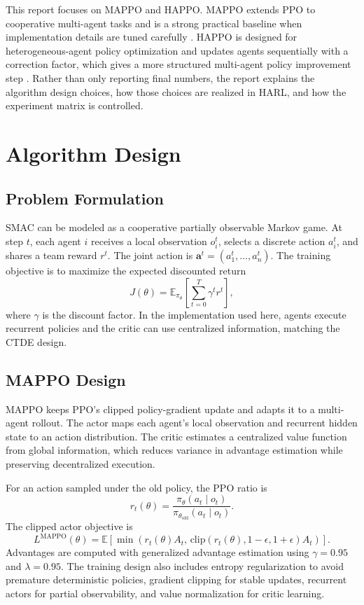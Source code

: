 \documentclass{article}
\begin{document}
This report focuses on MAPPO and HAPPO. MAPPO extends PPO to cooperative multi-agent tasks and is a strong practical baseline when implementation details are tuned carefully \cite{yu2022surprising}. HAPPO is designed for heterogeneous-agent policy optimization and updates agents sequentially with a correction factor, which gives a more structured multi-agent policy improvement step \cite{zhong2024heterogeneous}. Rather than only reporting final numbers, the report explains the algorithm design choices, how those choices are realized in HARL, and how the experiment matrix is controlled.

\section{Algorithm Design}

\subsection{Problem Formulation}

SMAC can be modeled as a cooperative partially observable Markov game. At step \(t\), each agent \(i\) receives a local observation \(o_i^t\), selects a discrete action \(a_i^t\), and shares a team reward \(r^t\). The joint action is \(\mathbf{a}^t=(a_1^t,\ldots,a_n^t)\). The training objective is to maximize the expected discounted return
\[
J(\theta)=\mathbb{E}_{\pi_\theta}\left[\sum_{t=0}^{T}\gamma^t r^t\right],
\]
where \(\gamma\) is the discount factor. In the implementation used here, agents execute recurrent policies and the critic can use centralized information, matching the CTDE design.

\subsection{MAPPO Design}

MAPPO keeps PPO's clipped policy-gradient update and adapts it to a multi-agent rollout. The actor maps each agent's local observation and recurrent hidden state to an action distribution. The critic estimates a centralized value function from global information, which reduces variance in advantage estimation while preserving decentralized execution.

For an action sampled under the old policy, the PPO ratio is
\[
r_t(\theta)=\frac{\pi_\theta(a_t\mid o_t)}{\pi_{\theta_{\text{old}}}(a_t\mid o_t)}.
\]
The clipped actor objective is
\[
L^{\text{MAPPO}}(\theta)=
\mathbb{E}\left[\min\left(r_t(\theta)A_t,\,
\text{clip}(r_t(\theta),1-\epsilon,1+\epsilon)A_t\right)\right].
\]
Advantages are computed with generalized advantage estimation using \(\gamma=0.95\) and \(\lambda=0.95\). The training design also includes entropy regularization to avoid premature deterministic policies, gradient clipping for stable updates, recurrent actors for partial observability, and value normalization for critic learning.
\end{document}

